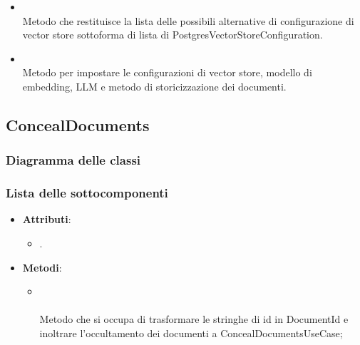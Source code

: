 \documentclass[10pt, a4paper]{article}
\begin{document}
\begin{itemize}
\begin{itemize}
            \item {}\\
            Metodo che restituisce la lista delle possibili alternative di configurazione di vector store sottoforma di lista di PostgresVectorStoreConfiguration.

            \item {}\\
            Metodo per impostare le configurazioni di vector store, modello di embedding, LLM e metodo di storicizzazione dei documenti.
        \end{itemize}
    \end{itemize}




\subsection{ConcealDocuments}
\subsubsection{Diagramma delle classi}
\subsubsection{Lista delle sottocomponenti}

\label{ConcealDocumentsControllerDettaglio}
\begin{itemize}
    \item \textbf{Attributi}:
    \begin{itemize}
        \item {}.
    \end{itemize}
    \item \textbf{Metodi}:
    \begin{itemize}
        \item {}\\ \\
        Metodo che si occupa di trasformare le stringhe di id in DocumentId e inoltrare l'occultamento dei documenti a ConcealDocumentsUseCase;
    \end{itemize}
\end{itemize}
\end{document}
